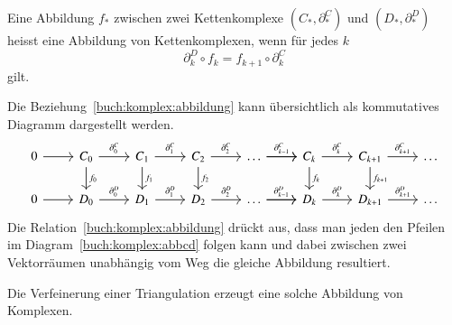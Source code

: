 \begin{definition}
Eine Abbildung $f_*$ zwischen zwei Kettenkomplexe $(C_*,\partial^C_*)$ und 
$(D_*,\partial^D_*)$ heisst eine Abbildung von Kettenkomplexen, wenn
für jedes $k$ 
\begin{equation}
\partial^D_k
\circ
f_{k}
=
f_{k+1}
\circ
\partial^C_k
\label{buch:komplex:abbildung}
\end{equation}
gilt.
\end{definition}

Die Beziehung~\eqref{buch:komplex:abbildung} kann übersichtlich als
kommutatives Diagramm dargestellt werden.
\begin{equation}
\begin{tikzcd}
0 \arrow[r]
	& C_0 \arrow[r, "\partial_0^C"]
		\arrow[d, "f_0"]
		& C_1 \arrow[r,"\partial_1^C"]
			\arrow[d, "f_1"]
			& C_2 \arrow[r,"\partial_2^C"]
				\arrow[d, "f_2"]
				& \dots \arrow[r]
					\arrow[r, "\partial_{k-1}^C"]
					& C_k
						\arrow[r, "\partial_k^C"]
						\arrow[d, "f_k"]
						& C_{k+1}\arrow[r, "\partial_{k+1}^C"]
							\arrow[d, "f_{k+1}"]
							& \dots
\\
0 \arrow[r]
	& D_0 \arrow[r, "\partial_0^D"]
		& D_1 \arrow[r,"\partial_1^D"]
			& D_2 \arrow[r,"\partial_2^D"]
				& \dots \arrow[r]
					\arrow[r, "\partial_{k-1}^D"]
					& D_k
						\arrow[r, "\partial_k^D"]
						& D_{k+1}\arrow[r, "\partial_{k+1}^D"]
							& \dots
\end{tikzcd}
\label{buch:komplex:abbcd}
\end{equation}
Die Relation~\eqref{buch:komplex:abbildung} drückt aus, dass man jeden
den Pfeilen im Diagram~\eqref{buch:komplex:abbcd} folgen kann und
dabei zwischen zwei Vektorräumen unabhängig vom Weg die gleiche Abbildung
resultiert.

Die Verfeinerung einer Triangulation erzeugt eine solche Abbildung von
Komplexen.



